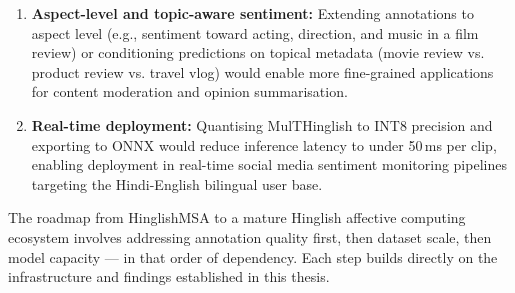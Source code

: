 \begin{enumerate}
    \item \textbf{Aspect-level and topic-aware sentiment:} Extending annotations to aspect level (e.g., sentiment toward acting, direction, and music in a film review) or conditioning predictions on topical metadata (movie review vs. product review vs. travel vlog) would enable more fine-grained applications for content moderation and opinion summarisation.

    \item \textbf{Real-time deployment:} Quantising MulTHinglish to INT8 precision and exporting to ONNX would reduce inference latency to under 50\,ms per clip, enabling deployment in real-time social media sentiment monitoring pipelines targeting the Hindi-English bilingual user base.
\end{enumerate}

The roadmap from HinglishMSA to a mature Hinglish affective computing ecosystem involves addressing annotation quality first, then dataset scale, then model capacity --- in that order of dependency. Each step builds directly on the infrastructure and findings established in this thesis.

\newpage
